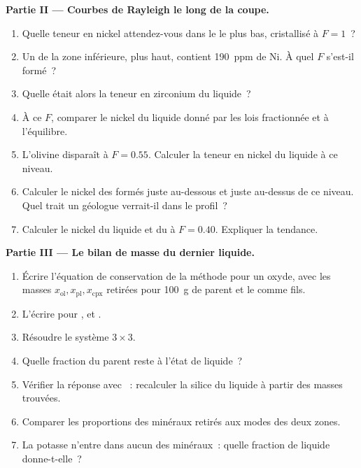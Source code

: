 \begin{problem}
\noindent\textbf{Partie II --- Courbes de Rayleigh le long de la coupe.}
\begin{enumerate}[resume]
\item Quelle teneur en nickel attendez-vous dans le  le plus bas, cristallisé à
$F = 1$~?
\item Un  de la zone inférieure, plus haut, contient \qty{190}{ppm} de Ni. À quel $F$ s'est-il
formé~?
\item Quelle était alors la teneur en zirconium du liquide~?
\item À ce $F$, comparer le nickel du liquide donné par les lois
fractionnée et à l'équilibre.
\item L'olivine disparaît à $F = 0.55$. Calculer la teneur en nickel du liquide
à ce niveau.
\item Calculer le nickel des  formés juste au-dessous et juste au-dessus de ce
niveau. Quel trait un géologue verrait-il dans le profil~?
\item Calculer le nickel du liquide et du  à $F = 0.40$. Expliquer
la tendance.
\end{enumerate}

\noindent\textbf{Partie III --- Le bilan de masse du dernier liquide.}
\begin{enumerate}[resume]
\item Écrire l'équation de conservation de la méthode pour un oxyde, avec les masses
$x_{\mathrm{ol}}, x_{\mathrm{pl}}, x_{\mathrm{cpx}}$ retirées pour \qty{100}{g} de
parent et le  comme fils.
\item L'écrire pour ,  et .
\item Résoudre le système $3 \times 3$.
\item Quelle fraction du parent reste à l'état de liquide~?
\item Vérifier la réponse avec ~: recalculer la silice du liquide à partir des
masses trouvées.
\item Comparer les proportions des minéraux retirés aux modes des deux
zones.
\item La potasse n'entre dans aucun des minéraux~: quelle fraction de liquide donne-t-elle~?
\end{enumerate}


\end{problem}
